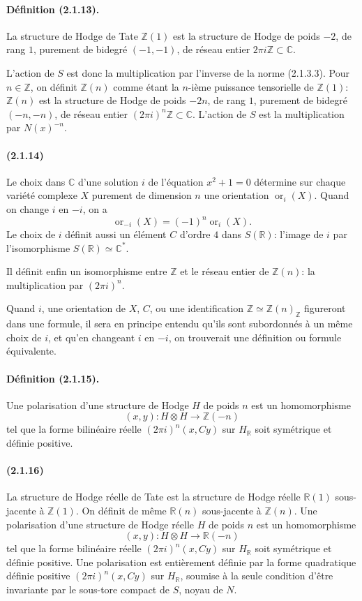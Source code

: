 \documentclass[10pt]{article}
\newcommand{\C}{\mathbb C}
\newcommand{\Z}{\mathbb Z}
\newcommand{\R}{\mathbb R}
\newcommand{\ornt}{\operatorname{or}}
\begin{document}
\paragraph{Définition (2.1.13).} La structure de Hodge de Tate $\Z(1)$ est la structure de Hodge de poids $-2$, de rang $1$, purement de bidegré $(-1,-1)$, de réseau entier $2\pi i\Z\subset\C$.

L'action de $S$ est donc la multiplication par l'inverse de la norme (2.1.3.3). Pour $n\in\Z$, on définit $\Z(n)$ comme étant la $n$-ième puissance tensorielle de $\Z(1)$: $\Z(n)$ est la structure de Hodge de poids $-2n$, de rang $1$, purement de bidegré $(-n,-n)$, de réseau entier $(2\pi i)^n\Z\subset\C$. L'action de $S$ est la multiplication par $N(x)^{-n}$.

\paragraph{(2.1.14)} Le choix dans $\C$ d'une solution $i$ de l'équation $x^2+1=0$ détermine sur chaque variété complexe $X$ purement de dimension $n$ une orientation $\ornt_i(X)$. Quand on change $i$ en $-i$, on a
\[
\ornt_{-i}(X)=(-1)^n\ornt_i(X).
\]
Le choix de $i$ définit aussi un élément $C$ d'ordre $4$ dans $S(\R)$: l'image de $i$ par l'isomorphisme $S(\R)\simeq\C^*$.

Il définit enfin un isomorphisme entre $\Z$ et le réseau entier de $\Z(n)$: la multiplication par $(2\pi i)^n$.

Quand $i$, une orientation de $X$, $C$, ou une identification $\Z\simeq\Z(n)_\Z$ figureront dans une formule, il sera en principe entendu qu'ils sont subordonnés à un même choix de $i$, et qu'en changeant $i$ en $-i$, on trouverait une définition ou formule équivalente.

\paragraph{Définition (2.1.15).} Une polarisation d'une structure de Hodge $H$ de poids $n$ est un homomorphisme
\[
(x,y):H\otimes H\longrightarrow\Z(-n)
\]
tel que la forme bilinéaire réelle $(2\pi i)^n(x,Cy)$ sur $H_\R$ soit symétrique et définie positive.

\paragraph{(2.1.16)} La structure de Hodge réelle de Tate est la structure de Hodge réelle $\R(1)$ sous-jacente à $\Z(1)$. On définit de même $\R(n)$ sous-jacente à $\Z(n)$. Une polarisation d'une structure de Hodge réelle $H$ de poids $n$ est un homomorphisme
\[
(x,y):H\otimes H\longrightarrow\R(-n)
\]
tel que la forme bilinéaire réelle $(2\pi i)^n(x,Cy)$ sur $H_\R$ soit symétrique et définie positive. Une polarisation est entièrement définie par la forme quadratique définie positive $(2\pi i)^n(x,Cy)$ sur $H_\R$, soumise à la seule condition d'être invariante par le sous-tore compact de $S$, noyau de $N$.
\end{document}
